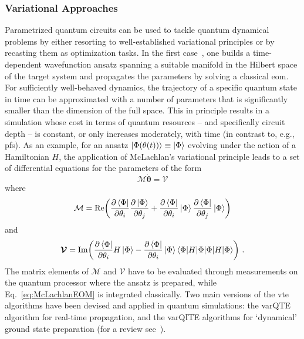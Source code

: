 \subsubsection{Variational Approaches} 
Parametrized quantum circuits can be used to tackle quantum dynamical problems by either resorting to well-established variational principles or by recasting them as optimization tasks. In the first case~\cite{Yuan2019}, one builds a time-dependent wavefunction ansatz spanning a suitable manifold in the Hilbert space of the target system and propagates the parameters by solving a classical \gls{eom}. For sufficiently well-behaved dynamics, the trajectory of a specific quantum state in time can be approximated with a number of parameters that is significantly smaller than the dimension of the full space. This in principle results in a simulation whose cost in terms of quantum resources -- and specifically circuit depth -- is constant, or only increases moderately, with time (in contrast to, e.g., \glspl{pf}). As an example, for an ansatz $\ket{\Phi(\theta(t))} \equiv \ket{\Phi}$ evolving under the action of a Hamiltonian $H$, the application of McLachlan’s variational principle leads to a set of differential equations for the parameters of the form~\cite{Yuan2019}
\begin{equation}
    \mathcal{M} \dot{\bm{\theta}} = \bm{\mathcal{V}} 
\label{eq:McLachlanEOM}
\end{equation}
where
\begin{equation}
    \mathcal{M} = \Re \biggl( \frac{\partial \bra{\Phi}}{\partial \theta_i} \frac{\partial \ket{\Phi}}{\partial \theta_j} + \frac{\partial \bra{\Phi}}{\partial \theta_i} \ket{\Phi} \frac{\partial \bra{\Phi}}{\partial \theta_j} \ket{\Phi} \biggr)
\end{equation}
and
\begin{equation}
    \bm{\mathcal{V}} = \Im \biggl( \frac{\partial \bra{\Phi}}{\partial \theta_i} H \ket{\Phi} - \frac{\partial \bra{\Phi}}{\partial \theta_i} \ket{\Phi} \braket{\Phi | H | \Phi} \biggr) \ .
\end{equation}
The matrix elements of $\mathcal{M}$ and $\bm{\mathcal{V}}$ have to be evaluated through measurements on the quantum processor where the ansatz is prepared, while Eq.~\eqref{eq:McLachlanEOM} is integrated classically. 
Two main versions of the \gls{vte} algorithms have been devised and applied in quantum simulations: the \gls{varQTE}  algorithm for real-time propagation, and the \gls{varQITE} algorithms for `dynamical' ground state preparation (for a review see~\cite{Miessen2023}). 

